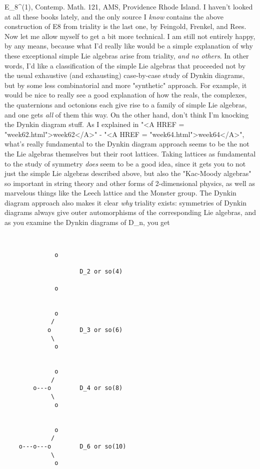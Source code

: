 E_8^{(1)}, Contemp. Math. 121, AMS, Providence Rhode Island.
I haven't looked at all these books lately, and the only 
source I \emph{know} contains the above construction of E8 from
triality is the last one, by Feingold, Frenkel, and Rees.
Now let me allow myself to get a bit more technical.
I am still not entirely happy, by any means, because what I'd
really like would be a simple explanation of why these exceptional
simple Lie algebras arise from triality, \emph{and no others}.  In other
words, I'd like a classification of the simple Lie algebras
that proceeded not by the usual exhaustive (and exhausting) case-by-case
study of Dynkin diagrams, but by some less combinatorial and more
"synthetic" approach.  For example, it would be nice to really see
a good explanation of how the reals, the complexes, the quaternions 
and octonions each give rise to a family of simple Lie algebras, and 
one gets \emph{all} of them this way.
On the other hand, don't think I'm knocking the Dynkin diagram stuff.
As I explained in "<A HREF = "week62.html">week62</A>" - 
"<A HREF = "week64.html">week64</A>", what's really fundamental
to the Dynkin diagram approach seems to be the not the Lie
algebras themselves but their root lattices.  Taking lattices
as fundamental to the study of symmetry \emph{does} seem to be a good
idea, since it gets you to not just the simple Lie algebras
described above, but also the "Kac-Moody algebras" so important
in string theory and other forms of 2-dimensional physics, as well
as marvelous things like the Leech lattice and the Monster group.
The Dynkin diagram approach also makes it clear \emph{why} triality 
exists: symmetries of Dynkin diagrams always give outer automorphisms
of the corresponding Lie algebras, and as you examine the Dynkin
diagrams of D_n, you get

\begin{verbatim}

 
              o  
                
                     D_2 or so(4) 
                
              o  
 
 
              o  
             /   
            o        D_3 or so(6)
             \   
              o  
 
 
              o  
             /   
        o---o        D_4 or so(8)
             \   
              o  
 
 
              o  
             /   
    o---o---o        D_6 or so(10)
             \   
              o  
 
\end{verbatim}
    
